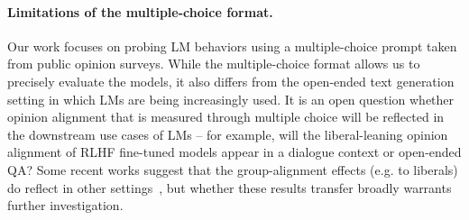 \paragraph{Limitations of the multiple-choice format.} Our work focuses on probing LM behaviors using a multiple-choice prompt taken from public opinion surveys. While the multiple-choice format allows us to precisely evaluate the models, it also differs from the open-ended text generation setting in which LMs are being increasingly used. 
It is an open question whether opinion alignment that is measured through multiple choice will be reflected in the downstream use cases of LMs -- for example, will the liberal-leaning opinion alignment of RLHF fine-tuned models appear in a dialogue context or open-ended QA? Some recent works suggest that the group-alignment effects (e.g. to liberals) do reflect in other settings~\citep{perez2022discovering,hartmann2023political}, but whether these results transfer broadly warrants further investigation.
